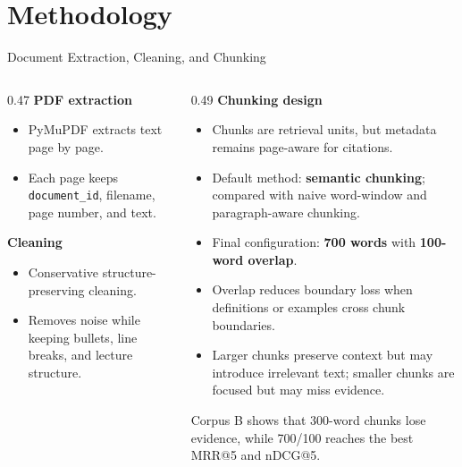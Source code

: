 \documentclass[10pt,aspectratio=169]{beamer}
\newcommand{\key}[1]{\textbf{\textcolor{FreshTeal}{#1}}}
\newcommand{\muted}[1]{{\scriptsize\textcolor{Muted}{#1}}}
\begin{document}
\section{Methodology}

\begin{frame}{Document Extraction, Cleaning, and Chunking}
    \begin{columns}[T,totalwidth=\textwidth]
        \begin{column}{0.47\textwidth}
            \textbf{PDF extraction}
            \begin{itemize}
                \item PyMuPDF extracts text page by page.
                \item Each page keeps \texttt{document\_id}, filename, page number, and text.
            \end{itemize}

            \textbf{Cleaning}
            \begin{itemize}
                \item Conservative structure-preserving cleaning.
                \item Removes noise while keeping bullets, line breaks, and lecture structure.
            \end{itemize}
        \end{column}
        \begin{column}{0.49\textwidth}
            \textbf{Chunking design}
            \begin{itemize}
                \item Chunks are retrieval units, but metadata remains page-aware for citations.
                \item Default method: \key{semantic chunking}; compared with naive word-window and paragraph-aware chunking.
                \item Final configuration: \key{700 words} with \key{100-word overlap}.
                \item Overlap reduces boundary loss when definitions or examples cross chunk boundaries.
                \item Larger chunks preserve context but may introduce irrelevant text; smaller chunks are focused but may miss evidence.
            \end{itemize}
            \vspace{0.4em}
            \muted{Corpus B shows that 300-word chunks lose evidence, while 700/100 reaches the best MRR@5 and nDCG@5.}
        \end{column}
    \end{columns}
\end{frame}
\end{document}
